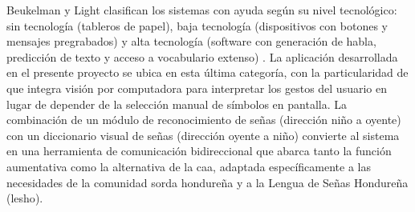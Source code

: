 Beukelman y Light clasifican los sistemas con ayuda según su nivel tecnológico: sin
tecnología (tableros de papel), baja tecnología (dispositivos con botones y mensajes
pregrabados) y alta tecnología (software con generación de habla, predicción de texto y
acceso a vocabulario extenso) \cite{beukelman_aac_2020}. La aplicación desarrollada en
el presente proyecto se ubica en esta última categoría, con la particularidad de que
integra visión por computadora para interpretar los gestos del usuario en lugar de
depender de la selección manual de símbolos en pantalla. La combinación de un módulo de
reconocimiento de señas (dirección niño a oyente) con un diccionario visual de señas
(dirección oyente a niño) convierte al sistema en una herramienta de
comunicación bidireccional que abarca tanto la función aumentativa como la alternativa de
la \acrshort{caa}, adaptada específicamente a las necesidades de la comunidad sorda hondureña y a la
Lengua de Señas Hondureña (\acrshort{lesho}).
